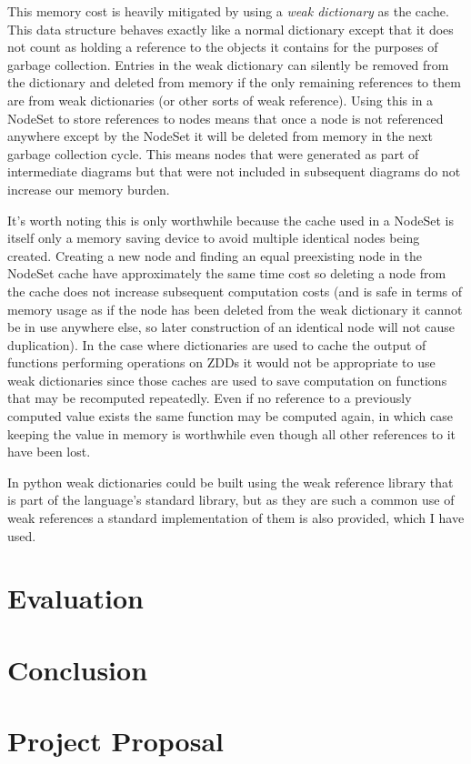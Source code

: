 \documentclass[12pt,a4paper,twoside,openright]{report}
\begin{document}
This memory cost is heavily mitigated by using a \textit{weak dictionary} as the cache. This data structure behaves exactly like a normal dictionary except that it does not count as holding a reference to the objects it contains for the purposes of garbage collection. Entries in the weak dictionary can silently be removed from the dictionary and deleted from memory if the only remaining references to them are from weak dictionaries (or other sorts of weak reference). Using this in a NodeSet to store references to nodes means that once a node is not referenced anywhere except by the NodeSet it will be deleted from memory in the next garbage collection cycle. This means nodes that were generated as part of intermediate diagrams but that were not included in subsequent diagrams do not increase our memory burden.

It's worth noting this is only worthwhile because the cache used in a NodeSet is itself only a memory saving device to avoid multiple identical nodes being created. Creating a new node and finding an equal preexisting node in the NodeSet cache have approximately the same time cost so deleting a node from the cache does not increase subsequent computation costs (and is safe in terms of memory usage as if the node has been deleted from the weak dictionary it cannot be in use anywhere else, so later construction of an identical node will not cause duplication). In the case where dictionaries are used to cache the output of functions performing operations on ZDDs it would not be appropriate to use weak dictionaries since those caches are used to save computation on functions that may be recomputed repeatedly. Even if no reference to a previously computed value exists the same function may be computed again, in which case keeping the value in memory is worthwhile even though all other references to it have been lost.

In python weak dictionaries could be built using the weak reference library that is part of the language's standard library, but as they are such a common use of weak references a standard implementation of them is also provided, which I have used.


\chapter{Evaluation}

\chapter{Conclusion}



\appendix

\chapter{Project Proposal}


\end{document}
